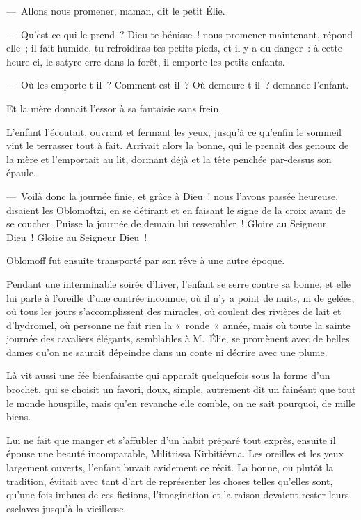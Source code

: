 \documentclass[french,twoside]{book} %
\begin{document}
— Allons nous promener, maman, dit le petit Élie.\par
— Qu’est-ce qui le prend ? Dieu te bénisse ! nous promener maintenant, répond-elle ; il fait humide, tu refroidiras tes petits pieds, et il y a du danger : à cette heure-ci, le satyre erre dans la forêt, il emporte les petits enfants.\par
— Où les emporte-t-il ? Comment est-il ? Où demeure-t-il ? demande l’enfant.\par
Et la mère donnait l’essor à sa fantaisie sans frein.\par
L’enfant l’écoutait, ouvrant et fermant les yeux, jusqu’à ce qu’enfin le sommeil vint le terrasser tout à fait. Arrivait alors la bonne, qui le prenait des genoux de la mère et l’emportait au lit, dormant déjà et la tête penchée par-dessus son épaule.\par
— Voilà donc la journée finie, et grâce à Dieu ! nous l’avons passée heureuse, disaient les Oblomoftzi, en se détirant et en faisant le signe de la croix avant de se coucher. Puisse la journée de demain lui ressembler ! Gloire au Seigneur Dieu ! Gloire au Seigneur Dieu !\par
Oblomoff fut ensuite transporté par son rêve à une autre époque.\par
Pendant une interminable soirée d’hiver, l’enfant se serre contre sa bonne, et elle lui parle à l’oreille d’une contrée inconnue, où il n’y a point de nuits, ni de gelées, où tous les jours s’accomplissent des miracles, où coulent des rivières de lait et d’hydromel, où personne ne fait rien la « ronde » année, mais où toute la sainte journée des cavaliers élégants, semblables à M. Élie, se promènent avec de belles dames qu’on ne saurait dépeindre dans un conte ni décrire avec une plume.\par
Là vit aussi une fée bienfaisante qui apparaît quelquefois sous la forme d’un brochet, qui se choisit un favori, doux, simple, autrement dit un fainéant que tout le monde houspille, mais qu’en revanche elle comble, on ne sait pourquoi, de mille biens.\par
Lui ne fait que manger et s’affubler d’un habit préparé tout exprès, ensuite il épouse une beauté incomparable, Militrissa Kirbitiévna. Les oreilles et les yeux largement ouverts, l’enfant buvait avidement ce récit. La bonne, ou plutôt la tradition, évitait avec tant d’art de représenter les choses telles qu’elles sont, qu’une fois imbues de ces fictions, l’imagination et la raison devaient rester leurs esclaves jusqu’à la vieillesse.\par
\end{document}
